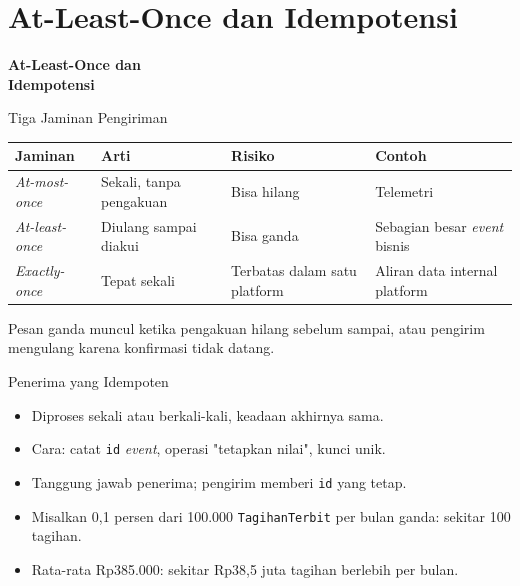 \documentclass[aspectratio=169, table, 12pt]{beamer}
\begin{document}
\section{At-Least-Once dan Idempotensi}

\begin{frame}{\hfill}
  \centering
  \Huge{\textbf{At-Least-Once dan\\Idempotensi}}
\end{frame}

\begin{frame}{{\Large Tiga Jaminan Pengiriman}}
  \footnotesize
  \begin{tabularx}{\textwidth}{>{\raggedright\arraybackslash}p{2.6cm}
      >{\raggedright\arraybackslash}X >{\raggedright\arraybackslash}X
      >{\raggedright\arraybackslash}X}
    \hline
    \textbf{Jaminan} & \textbf{Arti} & \textbf{Risiko} & \textbf{Contoh} \\
    \hline
    \textit{At-most-once} & Sekali, tanpa pengakuan & Bisa hilang
      & Telemetri \\
    \hline
    \textit{At-least-once} & Diulang sampai diakui & Bisa ganda
      & Sebagian besar \textit{event} bisnis \\
    \hline
    \textit{Exactly-once} & Tepat sekali & Terbatas dalam satu platform
      & Aliran data internal platform \\
    \hline
  \end{tabularx}

  \vspace{10pt}
  \small
  Pesan ganda muncul ketika pengakuan hilang sebelum sampai, atau pengirim
  mengulang karena konfirmasi tidak datang.
\end{frame}

\begin{frame}{{\Large Penerima yang Idempoten}}
  \vspace{6pt}
  \begin{itemize}
    \item Diproses sekali atau berkali-kali, keadaan akhirnya sama.
    \item Cara: catat \texttt{id} \textit{event}, operasi "tetapkan nilai",
          kunci unik.
    \item Tanggung jawab penerima; pengirim memberi \texttt{id} yang tetap.
    \item Misalkan 0,1 persen dari 100.000 \texttt{TagihanTerbit} per bulan
          ganda: sekitar 100 tagihan.
    \item Rata-rata Rp385.000: sekitar Rp38,5 juta tagihan berlebih per bulan.
  \end{itemize}
\end{frame}
\end{document}
